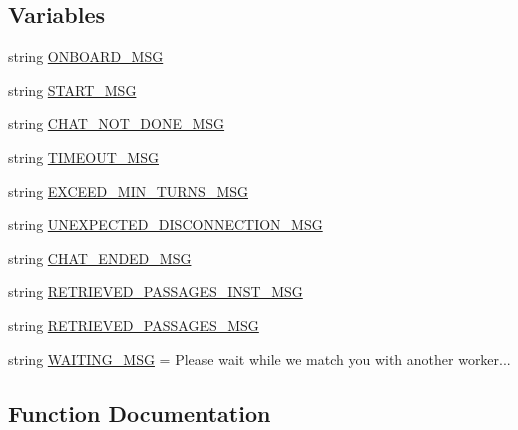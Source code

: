 \subsection*{Variables}
\begin{DoxyCompactItemize}
\item 
string \hyperlink{namespaceworlds_a281f70599c0c90fe0f2774496a290a21}{O\+N\+B\+O\+A\+R\+D\+\_\+\+M\+SG}
\item 
string \hyperlink{namespaceworlds_aa8939318837861f64b5aac2f59af2be0}{S\+T\+A\+R\+T\+\_\+\+M\+SG}
\item 
string \hyperlink{namespaceworlds_a73dde532230620d581e7e12ac6ffd57a}{C\+H\+A\+T\+\_\+\+N\+O\+T\+\_\+\+D\+O\+N\+E\+\_\+\+M\+SG}
\item 
string \hyperlink{namespaceworlds_a4caefb117b7b7109a5d6372d69593068}{T\+I\+M\+E\+O\+U\+T\+\_\+\+M\+SG}
\item 
string \hyperlink{namespaceworlds_a2d3d444358504bb81ed5030aec45d19f}{E\+X\+C\+E\+E\+D\+\_\+\+M\+I\+N\+\_\+\+T\+U\+R\+N\+S\+\_\+\+M\+SG}
\item 
string \hyperlink{namespaceworlds_ac3bfe2941369975e9eacad114bc813fb}{U\+N\+E\+X\+P\+E\+C\+T\+E\+D\+\_\+\+D\+I\+S\+C\+O\+N\+N\+E\+C\+T\+I\+O\+N\+\_\+\+M\+SG}
\item 
string \hyperlink{namespaceworlds_adfa70af8db946dbd989fe49581f74f19}{C\+H\+A\+T\+\_\+\+E\+N\+D\+E\+D\+\_\+\+M\+SG}
\item 
string \hyperlink{namespaceworlds_a4a2242a0fd46ff0169b6c4ff77ef348c}{R\+E\+T\+R\+I\+E\+V\+E\+D\+\_\+\+P\+A\+S\+S\+A\+G\+E\+S\+\_\+\+I\+N\+S\+T\+\_\+\+M\+SG}
\item 
string \hyperlink{namespaceworlds_af2e66263c542ed047e1b449268445e63}{R\+E\+T\+R\+I\+E\+V\+E\+D\+\_\+\+P\+A\+S\+S\+A\+G\+E\+S\+\_\+\+M\+SG}
\item 
string \hyperlink{namespaceworlds_a5d7e0b829b14d5c6c8156bea77a33e07}{W\+A\+I\+T\+I\+N\+G\+\_\+\+M\+SG} = \textquotesingle{}Please wait while we match you with another worker...\textquotesingle{}
\end{DoxyCompactItemize}


\subsection{Function Documentation}
\mbox{\label{namespaceworlds_a177b303e39cf751847e7f357c5bcc1ff}} 
